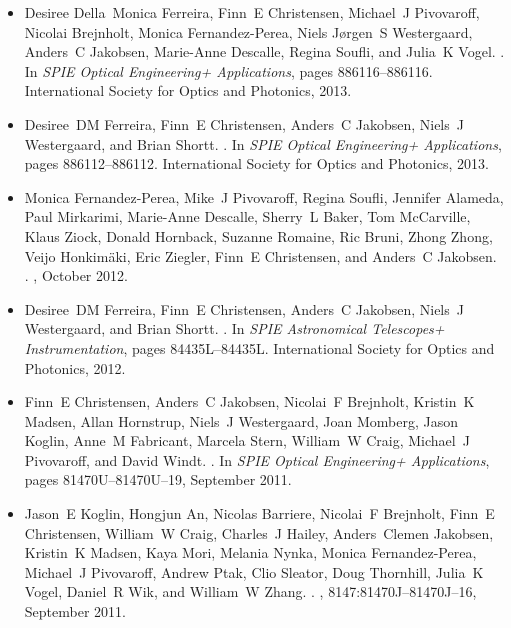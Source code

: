 \begin{itemize}
\item
Desiree Della~Monica Ferreira, Finn~E Christensen, Michael~J Pivovaroff,
  Nicolai Brejnholt, Monica Fernandez-Perea, Niels J{\o}rgen~S Westergaard,
  Anders~C Jakobsen, Marie-Anne Descalle, Regina Soufli, and Julia~K Vogel.
.
\newblock In {\em SPIE Optical Engineering+ Applications}, pages
  886116--886116. International Society for Optics and Photonics, 2013.

\item
Desiree~DM Ferreira, Finn~E Christensen, Anders~C Jakobsen, Niels~J
  Westergaard, and Brian Shortt.
.
\newblock In {\em SPIE Optical Engineering+ Applications}, pages
  886112--886112. International Society for Optics and Photonics, 2013.

\item
Monica Fernandez-Perea, Mike~J Pivovaroff, Regina Soufli, Jennifer Alameda,
  Paul Mirkarimi, Marie-Anne Descalle, Sherry~L Baker, Tom McCarville, Klaus
  Ziock, Donald Hornback, Suzanne Romaine, Ric Bruni, Zhong Zhong, Veijo
  Honkim{\"a}ki, Eric Ziegler, Finn~E Christensen, and Anders~C Jakobsen.
.
, October
  2012.

\item
Desiree~DM Ferreira, Finn~E Christensen, Anders~C Jakobsen, Niels~J
  Westergaard, and Brian Shortt.
.
\newblock In {\em SPIE Astronomical Telescopes+ Instrumentation}, pages
  84435L--84435L. International Society for Optics and Photonics, 2012.

\item
Finn~E Christensen, Anders~C Jakobsen, Nicolai~F Brejnholt, Kristin~K Madsen,
  Allan Hornstrup, Niels~J Westergaard, Joan Momberg, Jason Koglin, Anne~M
  Fabricant, Marcela Stern, William~W Craig, Michael~J Pivovaroff, and David
  Windt.
.
\newblock In {\em SPIE Optical Engineering+ Applications}, pages
  81470U--81470U--19, September 2011.

\item
Jason~E Koglin, Hongjun An, Nicolas Barriere, Nicolai~F Brejnholt, Finn~E
  Christensen, William~W Craig, Charles~J Hailey, Anders~Clemen Jakobsen,
  Kristin~K Madsen, Kaya Mori, Melania Nynka, Monica Fernandez-Perea, Michael~J
  Pivovaroff, Andrew Ptak, Clio Sleator, Doug Thornhill, Julia~K Vogel,
  Daniel~R Wik, and William~W Zhang.
.
,
  8147:81470J--81470J--16, September 2011.


\end{itemize}
